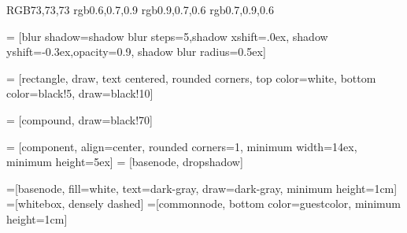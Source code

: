 \definecolor{dark-gray}   {RGB}{73,73,73}
\definecolor{usercolor}   {rgb}{0.6,0.7,0.9}
\definecolor{kernelcolor} {rgb}{0.9,0.7,0.6}
\definecolor{guestcolor}  {rgb}{0.7,0.9,0.6}

 = [blur shadow={shadow blur steps=5,shadow xshift=.0ex,
                                       shadow yshift=-0.3ex,opacity=0.9,
                                       shadow blur radius=0.5ex}]

 = [rectangle, draw, text centered,
                        rounded corners,
                        top color=white,
                        bottom color=black!5,
                        draw=black!10]

 = [compound, draw=black!70]

 = [component, align=center,
                        rounded corners=1, minimum width=14ex,
                        minimum height=5ex]
 = [basenode, dropshadow]

=[basenode, fill=white, text=dark-gray, draw=dark-gray, minimum height=1cm]
=[whitebox, densely dashed]
=[commonnode, bottom color=guestcolor, minimum height=1cm]
